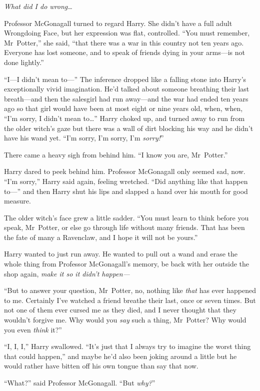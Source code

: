 \emph{What did I do wrong…}

Professor McGonagall turned to regard Harry. She didn’t have a full adult Wrongdoing Face, but her expression was flat, controlled. “You must remember, Mr~Potter,” she said, “that there was a war in this country not ten years ago. Everyone has lost someone, and to speak of friends dying in your arms—is not done lightly.”

“I—I didn’t mean to—” The inference dropped like a falling stone into Harry’s exceptionally vivid imagination. He’d talked about someone breathing their last breath—and then the salesgirl had run away—and the war had ended ten years ago so that girl would have been at most eight or nine years old, when, when, “I’m sorry, I didn’t mean to…” Harry choked up, and turned away to run from the older witch’s gaze but there was a wall of dirt blocking his way and he didn’t have his wand yet. “I’m sorry, I’m sorry, I’m \emph{sorry!}”

There came a heavy sigh from behind him. “I know you are, Mr~Potter.”

Harry dared to peek behind him. Professor McGonagall only seemed sad, now. “I’m sorry,” Harry said again, feeling wretched. “Did anything like that happen to—” and then Harry shut his lips and slapped a hand over his mouth for good measure.

The older witch’s face grew a little sadder. “You must learn to think before you speak, Mr~Potter, or else go through life without many friends. That has been the fate of many a Ravenclaw, and I hope it will not be yours.”

Harry wanted to just run away. He wanted to pull out a wand and erase the whole thing from Professor McGonagall’s memory, be back with her outside the shop again, \emph{make it so it didn’t happen—}

“But to answer your question, Mr~Potter, no, nothing like \emph{that} has ever happened to me. Certainly I’ve watched a friend breathe their last, once or seven times. But not one of them ever cursed me as they died, and I never thought that they wouldn’t forgive me. Why would you \emph{say} such a thing, Mr~Potter? Why would you even \emph{think} it?”

“I, I, I,” Harry swallowed. “It’s just that I always try to imagine the worst thing that could happen,” and maybe he’d also been joking around a little but he would rather have bitten off his own tongue than say that now.

“What?” said Professor McGonagall. “But \emph{why?}”

